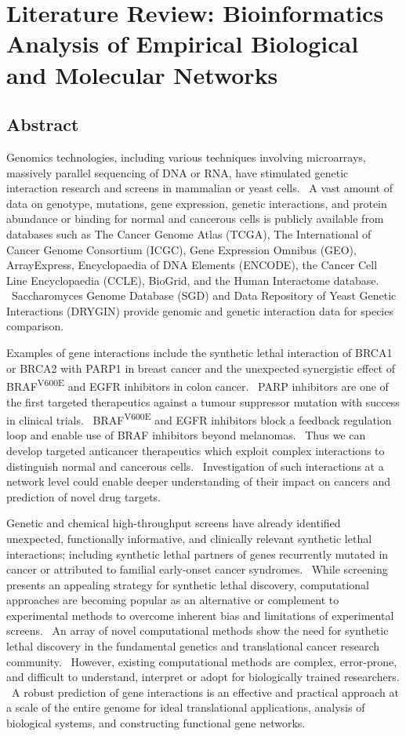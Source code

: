 \chapter{Literature Review: Bioinformatics Analysis of Empirical Biological and
Molecular Networks}
\label{chap:lit_review}

\section{Abstract}
Genomics technologies, including various techniques involving
microarrays, massively parallel sequencing of DNA or RNA, have
stimulated genetic interaction research and screens in mammalian or
yeast cells. \ A vast amount of data on genotype, mutations, gene
expression, genetic interactions, and protein abundance or binding for
normal and cancerous cells is publicly available from databases such as
The Cancer Genome Atlas (TCGA), The International of Cancer Genome
Consortium (ICGC), Gene Expression Omnibus (GEO), ArrayExpress,
Encyclopaedia of DNA Elements (ENCODE), the Cancer Cell Line
Encyclopaedia (CCLE), BioGrid, and the Human Interactome database.
\ Saccharomyces Genome Database (SGD) and Data Repository of Yeast
Genetic Interactions (DRYGIN) provide genomic and genetic interaction
data for species comparison. \ 


Examples of gene interactions include the synthetic lethal interaction
of BRCA1 or BRCA2 with PARP1 in breast cancer and the unexpected
synergistic effect of BRAF\textsuperscript{V600E} and EGFR inhibitors
in colon cancer. \ PARP inhibitors are one of the first targeted
therapeutics against a tumour suppressor mutation with success in
clinical trials. \ BRAF\textsuperscript{V600E} and EGFR inhibitors
block a feedback regulation loop and enable use of BRAF inhibitors
beyond melanomas. \ Thus we can develop targeted anticancer
therapeutics which exploit complex interactions to distinguish normal
and cancerous cells. \ Investigation of such interactions at a network
level could enable deeper understanding of their impact on cancers and
prediction of novel drug targets.


Genetic and chemical high-throughput screens have already identified
unexpected, functionally informative, and clinically relevant synthetic
lethal interactions; including synthetic lethal partners of genes
recurrently mutated in cancer or attributed to familial early-onset
cancer syndromes. \ While screening presents an appealing strategy for
synthetic lethal discovery, computational approaches are becoming
popular as an alternative or complement to experimental methods to
overcome inherent bias and limitations of experimental screens. \ An
array of novel computational methods show the need for synthetic lethal
discovery in the fundamental genetics and translational cancer research
community. \ However, existing computational methods are complex,
error-prone, and difficult to understand, interpret or adopt for
biologically trained researchers. \ A robust prediction of gene
interactions is an effective and practical approach at a scale of the
entire genome for ideal translational applications, analysis of
biological systems, and constructing functional gene networks.


